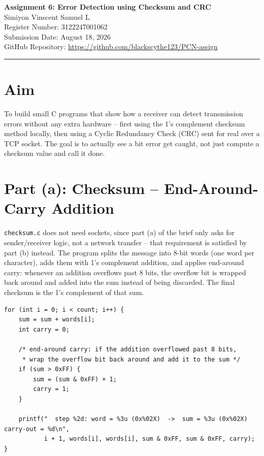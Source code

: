 \documentclass[11pt,a4paper]{article}
\begin{document}
\begin{center}
{\LARGE \textbf{Assignment 6: Error Detection using Checksum and CRC}}\\[4mm]
Simiyon Vinscent Samuel L\\
Register Number: 3122247001062\\
Submission Date: August 18, 2026\\
GitHub Repository: \url{https://github.com/blackscythe123/PCN-assign}
\end{center}

\vspace{2mm}
\hrule
\vspace{4mm}

\section*{Aim}
To build small C programs that show how a receiver can detect transmission errors
without any extra hardware -- first using the 1's complement checksum method locally,
then using a Cyclic Redundancy Check (CRC) sent for real over a TCP socket. The goal is
to actually see a bit error get caught, not just compute a checksum value and call it
done.

\section*{Part (a): Checksum -- End-Around-Carry Addition}
\texttt{checksum.c} does not need sockets, since part (a) of the brief only asks for
sender/receiver logic, not a network transfer -- that requirement is satisfied by part
(b) instead. The program splits the message into 8-bit words (one word per character),
adds them with 1's complement addition, and applies end-around carry: whenever an
addition overflows past 8 bits, the overflow bit is wrapped back around and added into
the sum instead of being discarded. The final checksum is the 1's complement of that
sum.

\begin{lstlisting}[caption={checksum.c -- add\_with\_end\_around\_carry(): the core end-around-carry loop, printing every intermediate sum and carry}]
for (int i = 0; i < count; i++) {
    sum = sum + words[i];
    int carry = 0;

    /* end-around carry: if the addition overflowed past 8 bits,
     * wrap the overflow bit back around and add it to the sum */
    if (sum > 0xFF) {
        sum = (sum & 0xFF) + 1;
        carry = 1;
    }

    printf("  step %2d: word = %3u (0x%02X)  ->  sum = %3u (0x%02X)  carry-out = %d\n",
           i + 1, words[i], words[i], sum & 0xFF, sum & 0xFF, carry);
}
\end{lstlisting}
\end{document}
